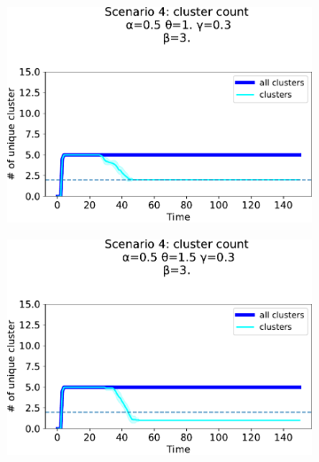 \begin{figure}[!ht]
  \begin{subfigure}[b]{0.32\textwidth}
    \centering
    \includegraphics[width=\textwidth]{papers/swarm-intelligence2021/img/simulations/overlay_0_021_α-0.5_θ-1._γ-0.3_β-3._ω-0._ζ-0..pdf}
  \end{subfigure}
  \hfill
  \begin{subfigure}[b]{0.32\textwidth}
    \centering
    \includegraphics[width=\textwidth]{papers/swarm-intelligence2021/img/simulations/overlay_0_021_α-0.5_θ-1.5_γ-0.3_β-3._ω-0._ζ-0..pdf}
  \end{subfigure}
  \hfill
  \begin{subfigure}[b]{0.32\textwidth}
    \centering

\end{subfigure}
\end{figure}
